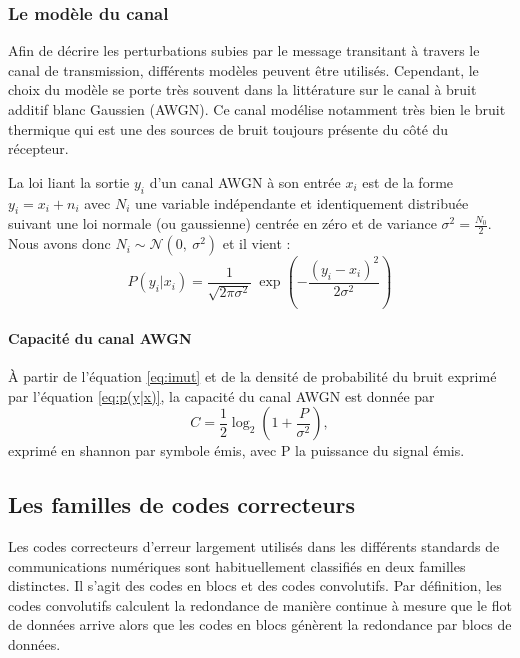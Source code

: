 \subsubsection{Le modèle du canal}\label{ss:cod_canal}
Afin de décrire les perturbations subies par le message transitant à travers le canal de transmission, différents modèles 
peuvent être utilisés. 
Cependant, le choix du modèle se porte très souvent dans la littérature sur le canal à bruit additif blanc Gaussien 
(AWGN). 
Ce canal modélise notamment très bien le bruit thermique qui est une des sources de bruit toujours présente du côté du récepteur.

La loi liant la sortie $y_i$ d'un canal AWGN à son entrée $x_i$ est de la forme $y_i=x_i+n_i$ avec $N_i$ une variable 
indépendante et identiquement distribuée suivant une loi normale (ou gaussienne) centrée en zéro et de variance $\sigma^2 = \frac{N_0}{2}$. Nous avons donc
$N_i \sim \mathcal{N}(0,\ \sigma^2)$ et il vient :
\begin{equation}
	\label{eq:p(y|x)}
	P(y_i|x_i) = \frac{1}{\sqrt{2\pi \sigma^2}}~\exp\left(-{\frac{(y_i-x_i)^2}{2\sigma^2}}\right)
\end{equation}

\paragraph*{Capacité du canal AWGN}
À partir de l'équation \ref{eq:imut} et de la densité de probabilité du bruit exprimé par l'équation \ref{eq:p(y|x)}, la 
capacité du canal AWGN est donnée par \begin{equation}\label{eq:capacity}
C = \frac{1}{2} \log_2\left(1 + \frac{P}{\sigma^2}\right),
\end{equation}
exprimé en shannon par symbole émis, avec P la puissance du signal émis.

\subsection{Les familles de codes correcteurs}
Les codes correcteurs d'erreur largement utilisés dans les différents standards de communications numériques 
sont habituellement classifiés en deux familles distinctes. Il s'agit des codes en blocs et des codes convolutifs. Par définition, 
les codes convolutifs calculent la redondance de manière continue à mesure que le flot de données arrive alors que les codes en blocs génèrent la redondance par blocs de données.
